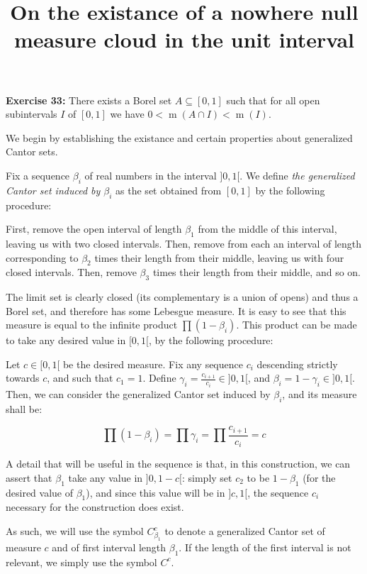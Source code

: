 \documentclass{article}
\title{On the existance of a nowhere null measure cloud in the unit interval}
\author{}
\date{}
\DeclareMathOperator{\m}{m}
\begin{document}
	\maketitle
	
	\textbf{Exercise 33:} There exists a Borel set $A \subseteq [0,1]$ such that for all open subintervals $I$ of $[0,1]$ we have $0 < \m(A \cap I) < \m(I)$.
	
	\bigskip
	
	We begin by establishing the existance and certain properties about generalized Cantor sets.
	
	Fix a sequence $\beta_i$ of real numbers in the interval $]0,1[$. We define \emph{the generalized Cantor set induced by $\beta_i$} as the set obtained from $[0,1]$ by the following procedure:
	
	First, remove the open interval of length $\beta_1$ from the middle of this interval, leaving us with two closed intervals. Then, remove from each an interval of length corresponding to $\beta_2$ times their length from their middle, leaving us with four closed intervals. Then, remove $\beta_3$ times their length from their middle, and so on.
	
	The limit set is clearly closed (its complementary is a union of opens) and thus a Borel set, and therefore has some Lebesgue measure. It is easy to see that this measure is equal to the infinite product $\prod (1 - \beta_i)$. This product can be made to take any desired value in $[0, 1[$, by the following procedure:
	
	Let $c \in [0, 1[$ be the desired measure. Fix any sequence $c_i$ descending strictly towards $c$, and such that $c_1 = 1$. Define $\gamma_i = \frac{c_{i+1}}{c_i} \in ]0, 1[$, and $\beta_i = 1 - \gamma_i \in ]0,1[$. Then, we can consider the generalized Cantor set induced by $\beta_i$, and its measure shall be:
	
	\[ \prod (1 - \beta_i) = \prod \gamma_i = \prod \frac{c_{i+1}}{c_i} = c \]
	
	A detail that will be useful in the sequence is that, in this construction, we can assert that $\beta_1$ take any value in $]0, 1-c[$: simply set $c_2$ to be $1 - \beta_1$ (for the desired value of $\beta_1$), and since this value will be in $]c, 1[$, the sequence $c_i$ necessary for the construction does exist.
	
	As such, we will use the symbol $C^c_{\beta_1}$ to denote a generalized Cantor set of measure $c$ and of first interval length $\beta_1$. If the length of the first interval is not relevant, we simply use the symbol $C^c$.
	
\end{document}
